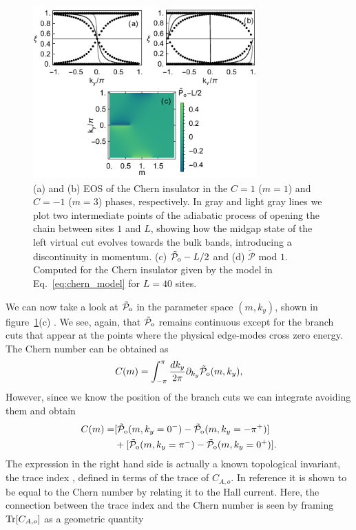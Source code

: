 \documentclass[twocolumn,amsmath,longbibliography,amssymb,superscriptaddress]{revtex4-1}
\newcommand{\tpo}{\tilde{\mathcal{P}}_{\rm o}}
\begin{document}
\begin{figure}[t]
\centering
\includegraphics[width=86mm]{fig7comp.pdf}
\caption{(a) and (b) EOS of the Chern insulator in the $C=1$ ($m=1$) and $C=-1$ ($m=3$) phases, respectively. In gray and light gray lines we plot two intermediate points of the adiabatic process of opening the chain between sites $1$ and $L$, showing how the midgap state of the left virtual cut evolves towards the bulk bands, introducing a discontinuity in momentum. (c) $\tpo-L/2$ and (d) $\tilde{\mathcal{P}}$ mod $1$. Computed for the Chern insulator given by the model in Eq.~\eqref{eq:chern_model} for $L=40$ sites. }
	\label{chern_insulator}
\end{figure}

We can now take a look at $\tpo$ in the parameter space $(m,k_y)$, shown in figure~\ref{chern_insulator}(c) . We see, again, that $\tpo$ remains continuous except for the branch cuts that appear at the points where the physical edge-modes cross zero energy. The Chern number can be obtained as
\begin{equation}
C(m) = \int_{-\pi}^{\pi}\frac{dk_y}{2\pi} \partial_{k_y} \tpo(m,k_y),
\label{eq:Zaletel_chern}
\end{equation}
However, since we know the position of the branch cuts we can integrate avoiding them and obtain
\begin{align}
C(m) =& [\tpo(m,k_y=0^-)-\tpo(m,k_y=-\pi^+)]\\
&+[\tpo(m,k_y=\pi^-)-\tpo(m,k_y=0^+)].
\end{align}
The expression in the right hand side is actually a known topological invariant, the trace index \cite{Alexandrinata2011}, defined in terms of the trace of $C_{A,o}$. In reference \cite{Alexandrinata2011} it is shown to be equal to the Chern number by relating it to the Hall current. Here, the connection between the trace index and the Chern number is seen by framing $\Tr[C_{A,o}]$ as a geometric quantity 
\end{document}
